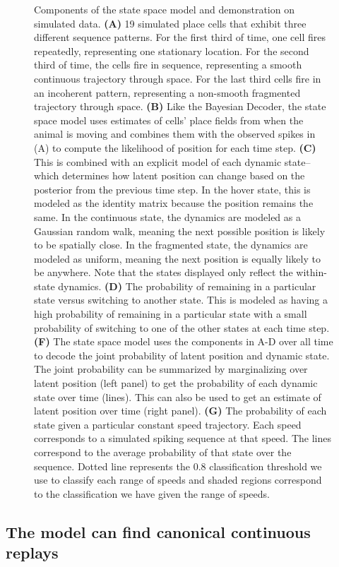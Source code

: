 \documentclass[times, twoside]{zHenriquesLab-StyleBioRxiv}
\begin{document}
\begin{figure}
\caption{Components of the state space model and demonstration on simulated data. \textbf{(A)} 19 simulated place cells that exhibit three different sequence patterns. For the first third of time, one cell fires repeatedly, representing one stationary location. For the second third of time, the cells fire in sequence, representing a smooth continuous trajectory through space. For the last third cells fire in an incoherent pattern, representing a non-smooth fragmented trajectory through space. \textbf{(B)} Like the Bayesian Decoder, the state space model uses estimates of cells' place fields from when the animal is moving and combines them with the observed spikes in (A) to compute the likelihood of position for each time step. \textbf{(C)} This is combined with an explicit model of each dynamic state--which determines how latent position can change based on the posterior from the previous time step. In the hover state, this is modeled as the identity matrix because the position remains the same. In the continuous state, the dynamics are modeled as a Gaussian random walk, meaning the next possible position is likely to be spatially close. In the fragmented state, the dynamics are modeled as uniform, meaning the next position is equally likely to be anywhere. Note that the states displayed only reflect the within-state dynamics. \textbf{(D)} The probability of remaining in a particular state versus switching to another state. This is modeled as having a high probability of remaining in a particular state with a small probability of switching to one of the other states at each time step. \textbf{(F)} The state space model uses the components in A-D over all time to decode the joint probability of latent position and dynamic state. The joint probability can be summarized by marginalizing over latent position (left panel) to get the probability of each dynamic state over time (lines). This can also be used to get an estimate of latent position over time (right panel). \textbf{(G)} The probability of each state given a particular constant speed trajectory. Each speed corresponds to a simulated spiking sequence at that speed. The lines correspond to the average probability of that state over the sequence. Dotted line represents the 0.8 classification threshold we use to classify each range of speeds and shaded regions correspond to the classification we have given the range of speeds.
}
\label{Figure1}
\end{figure}

\subsection*{The model can find canonical continuous replays}
\end{document}
